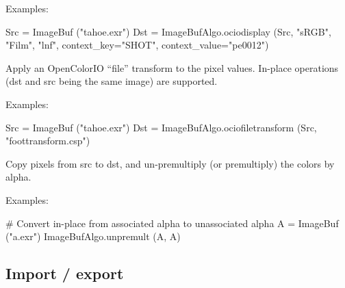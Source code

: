 \smallskip
\noindent Examples:
\begin{code}
    Src = ImageBuf ("tahoe.exr")
    Dst = ImageBufAlgo.ociodisplay (Src, "sRGB", "Film", "lnf",
                              context_key="SHOT", context_value="pe0012")
\end{code}
\apiend


 
Apply an OpenColorIO ``file'' transform to the pixel values.
In-place operations ({\cf dst} and {\cf src} being the same image)
are supported.

\smallskip
\noindent Examples:
\begin{code}
    Src = ImageBuf ("tahoe.exr")
    Dst = ImageBufAlgo.ociofiletransform (Src, "foottransform.csp")
\end{code}
\apiend


 
 
Copy pixels from {\cf src} to {\cf dst}, and un-premultiply (or
premultiply) the colors by alpha.

\smallskip
\noindent Examples:
\begin{code}
    # Convert in-place from associated alpha to unassociated alpha
    A = ImageBuf ("a.exr")
    ImageBufAlgo.unpremult (A, A)
\end{code}
\apiend



\subsection{Import / export}
\label{sec:iba:py:importexport}

